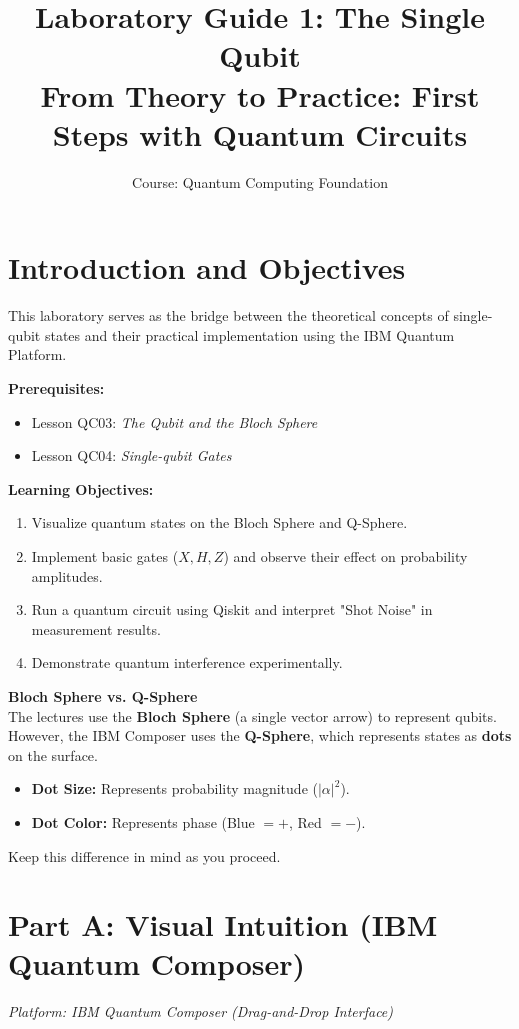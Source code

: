 \documentclass[a4paper,11pt]{article}
\title{\textbf{Laboratory Guide 1: The Single Qubit}\\
\large From Theory to Practice: First Steps with Quantum Circuits}
\author{Course: Quantum Computing Foundation}
\date{}
\begin{document}
\maketitle

\section{Introduction and Objectives}
This laboratory serves as the bridge between the theoretical concepts of single-qubit states and their practical implementation using the IBM Quantum Platform.

\vspace{0.3cm}
\noindent \textbf{Prerequisites:}
\begin{itemize}
    \item Lesson QC03: \textit{The Qubit and the Bloch Sphere}
    \item Lesson QC04: \textit{Single-qubit Gates}
\end{itemize}

\noindent \textbf{Learning Objectives:}
\begin{enumerate}
    \item Visualize quantum states on the Bloch Sphere and Q-Sphere.
    \item Implement basic gates ($X, H, Z$) and observe their effect on probability amplitudes.
    \item Run a quantum circuit using Qiskit and interpret "Shot Noise" in measurement results.
    \item Demonstrate quantum interference experimentally.
\end{enumerate}

\begin{warningbox}
\textbf{Bloch Sphere vs. Q-Sphere}\\
The lectures use the \textbf{Bloch Sphere} (a single vector arrow) to represent qubits. However, the IBM Composer uses the \textbf{Q-Sphere}, which represents states as \textbf{dots} on the surface.
\begin{itemize}
    \item \textbf{Dot Size:} Represents probability magnitude ($|\alpha|^2$).
    \item \textbf{Dot Color:} Represents phase (Blue $= +$, Red $= -$).
\end{itemize}
Keep this difference in mind as you proceed.
\end{warningbox}

\newpage

\section{Part A: Visual Intuition (IBM Quantum Composer)}
\textit{Platform: IBM Quantum Composer (Drag-and-Drop Interface)}
\end{document}
